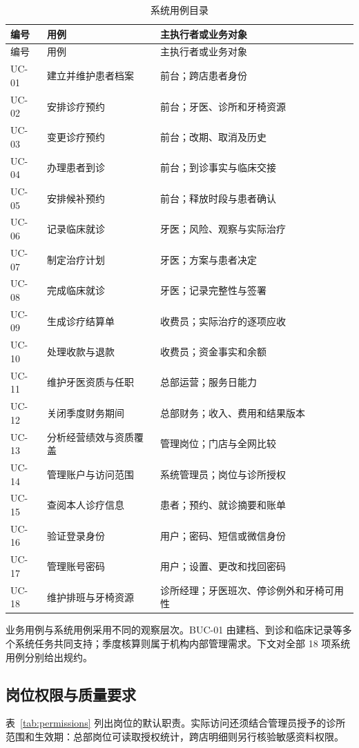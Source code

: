 \documentclass[12pt,a4paper,fontset=windows]{ctexart}
\begin{document}
\begin{longtable}{@{}C{15mm}L{47mm}L{77mm}@{}}\caption{系统用例目录}\label{tab:uc-list}\\
\toprule 编号 & 用例 & 主执行者或业务对象\\\midrule\endfirsthead
\toprule 编号 & 用例 & 主执行者或业务对象\\\midrule\endhead
UC-01 & 建立并维护患者档案 & 前台；跨店患者身份\\
UC-02 & 安排诊疗预约 & 前台；牙医、诊所和牙椅资源\\
UC-03 & 变更诊疗预约 & 前台；改期、取消及历史\\
UC-04 & 办理患者到诊 & 前台；到诊事实与临床交接\\
UC-05 & 安排候补预约 & 前台；释放时段与患者确认\\
UC-06 & 记录临床就诊 & 牙医；风险、观察与实际治疗\\
UC-07 & 制定治疗计划 & 牙医；方案与患者决定\\
UC-08 & 完成临床就诊 & 牙医；记录完整性与签署\\
UC-09 & 生成诊疗结算单 & 收费员；实际治疗的逐项应收\\
UC-10 & 处理收款与退款 & 收费员；资金事实和余额\\
UC-11 & 维护牙医资质与任职 & 总部运营；服务日能力\\
UC-12 & 关闭季度财务期间 & 总部财务；收入、费用和结果版本\\
UC-13 & 分析经营绩效与资质覆盖 & 管理岗位；门店与全网比较\\
UC-14 & 管理账户与访问范围 & 系统管理员；岗位与诊所授权\\
UC-15 & 查阅本人诊疗信息 & 患者；预约、就诊摘要和账单\\
UC-16 & 验证登录身份 & 用户；密码、短信或微信身份\\
UC-17 & 管理账号密码 & 用户；设置、更改和找回密码\\
UC-18 & 维护排班与牙椅资源 & 诊所经理；牙医班次、停诊例外和牙椅可用性\\
\bottomrule\end{longtable}

业务用例与系统用例采用不同的观察层次。BUC-01 由建档、到诊和临床记录等多个系统任务共同支持；季度核算则属于机构内部管理需求。下文对全部 18 项系统用例分别给出规约。

\subsection{岗位权限与质量要求}
表~\ref{tab:permissions} 列出岗位的默认职责。实际访问还须结合管理员授予的诊所范围和生效期：总部岗位可读取授权统计，跨店明细则另行核验敏感资料权限。
\end{document}

